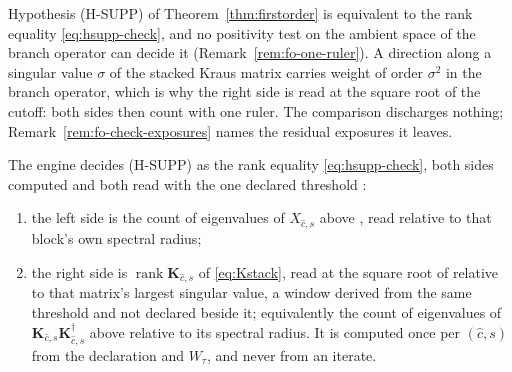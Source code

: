 
Hypothesis (H-SUPP) of Theorem~\ref{thm:firstorder} is equivalent to the rank
equality \eqref{eq:hsupp-check}, and no positivity test on the ambient space
of the branch operator can decide it (Remark~\ref{rem:fo-one-ruler}). A
direction along a singular value $\sigma$ of the stacked Kraus matrix carries
weight of order $\sigma^2$ in the branch operator, which is why the right
side is read at the square root of the cutoff: both sides then count with
one ruler. The comparison discharges nothing;
Remark~\ref{rem:fo-check-exposures} names the residual exposures it leaves.

\begin{requirement}\label{req:support-rank-check}
The engine decides (H-SUPP) as the rank equality \eqref{eq:hsupp-check},
both sides computed and both read with the one declared threshold
:
\begin{enumerate}[label=(\roman*),leftmargin=2.4em]
\item the left side is the count of eigenvalues of $X_{\hat c,s}$ above
  , read relative to that block's own spectral radius;
\item the right side is $\operatorname{rank}\mathbf K_{\hat c,s}$ of
  \eqref{eq:Kstack}, read at the square root of 
  relative to that matrix's largest singular value, a window derived from
  the same threshold and not declared beside it; equivalently the count of
  eigenvalues of $\mathbf K_{\hat c,s}\mathbf K_{\hat c,s}^{\dagger}$ above
   relative to its spectral radius. It is computed once
  per $(\hat c,s)$ from the declaration and $W_{\tau}$, and never from an
  iterate.
\end{enumerate}
\end{requirement}
